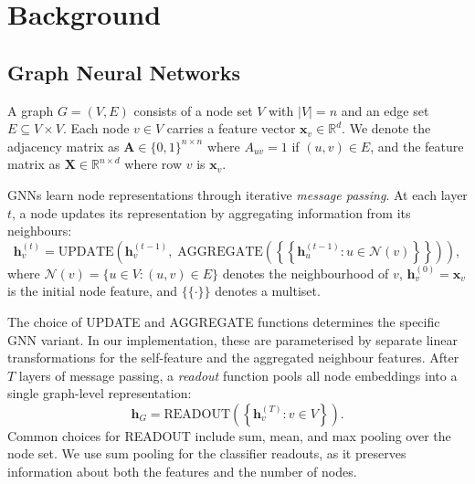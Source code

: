 \documentclass[12pt,a4paper]{article}
\begin{document}
\section{Background}
\label{sec:background}

\subsection{Graph Neural Networks}

A graph $G = (V, E)$ consists of a node set $V$ with $|V| = n$ and an edge set $E \subseteq V \times V$. Each node $v \in V$ carries a feature vector $\mathbf{x}_v \in \mathbb{R}^d$. We denote the adjacency matrix as $\mathbf{A} \in \{0,1\}^{n \times n}$ where $A_{uv} = 1$ if $(u,v) \in E$, and the feature matrix as $\mathbf{X} \in \mathbb{R}^{n \times d}$ where row $v$ is $\mathbf{x}_v$.

GNNs learn node representations through iterative \emph{message passing}. At each layer $t$, a node updates its representation by aggregating information from its neighbours:
\begin{equation}
  \mathbf{h}_v^{(t)} = \text{UPDATE}\!\left(\mathbf{h}_v^{(t-1)},\; \text{AGGREGATE}\!\left(\left\{\!\left\{\mathbf{h}_u^{(t-1)} : u \in \mathcal{N}(v)\right\}\!\right\}\right)\right),
  \label{eq:mp}
\end{equation}
where $\mathcal{N}(v) = \{u \in V : (u,v) \in E\}$ denotes the neighbourhood of $v$, $\mathbf{h}_v^{(0)} = \mathbf{x}_v$ is the initial node feature, and $\{\!\{\cdot\}\!\}$ denotes a multiset.

The choice of UPDATE and AGGREGATE functions determines the specific GNN variant. In our implementation, these are parameterised by separate linear transformations for the self-feature and the aggregated neighbour features. After $T$ layers of message passing, a \emph{readout} function pools all node embeddings into a single graph-level representation:
\begin{equation}
  \mathbf{h}_G = \text{READOUT}\!\left(\left\{\mathbf{h}_v^{(T)} : v \in V\right\}\right).
  \label{eq:readout}
\end{equation}
Common choices for READOUT include sum, mean, and max pooling over the node set. We use sum pooling for the classifier readouts, as it preserves information about both the features and the number of nodes.
\end{document}
